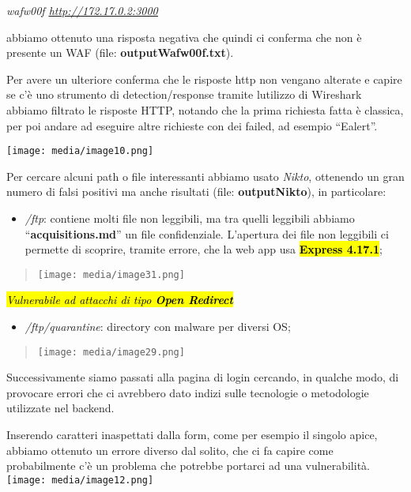 \emph{wafw00f
\href{http://172.17.0.2:3000}{\ul{http://172.17.0.2:3000}}}

abbiamo ottenuto una risposta negativa che quindi ci conferma che non è
presente un WAF (file: \textbf{outputWafw00f.txt}).

Per avere un ulteriore conferma che le risposte http non vengano
alterate e capire se c'è uno strumento di detection/response tramite
l\textquotesingle utilizzo di Wireshark abbiamo filtrato le risposte
HTTP, notando che la prima richiesta fatta è classica, per poi andare ad
eseguire altre richieste con dei failed, ad esempio ``Ealert''.

\texttt{[image: media/image10.png]}

Per cercare alcuni path o file interessanti abbiamo usato \emph{Nikto},
ottenendo un gran numero di falsi positivi ma anche risultati (file:
\textbf{outputNikto}), in particolare:

\begin{itemize}
\item
  \emph{/ftp}: contiene molti file non leggibili, ma tra quelli
  leggibili abbiamo ``\textbf{acquisitions.md}'' un file confidenziale.
  L'apertura dei file non leggibili ci permette di scoprire, tramite
  errore, che la web app usa \textbf{\hl{Express 4.17.1}};
\end{itemize}

\begin{quote}
\texttt{[image: media/image31.png]}
\end{quote}

\emph{\hl{Vulnerabile ad attacchi di tipo \textbf{Open Redirect}}}

\begin{itemize}
\item
  \emph{/ftp/quarantine}: directory con malware per diversi OS;
\end{itemize}

\begin{quote}
\texttt{[image: media/image29.png]}
\end{quote}

Successivamente siamo passati alla pagina di login cercando, in qualche
modo, di provocare errori che ci avrebbero dato indizi sulle tecnologie
o metodologie utilizzate nel backend.

Inserendo caratteri inaspettati dalla form, come per esempio il singolo
apice, abbiamo ottenuto un errore diverso dal solito, che ci fa capire
come probabilmente c'è un problema che potrebbe portarci ad una
vulnerabilità.\texttt{[image: media/image12.png]}

